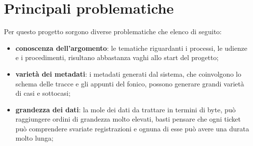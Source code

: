 \section{Principali problematiche}
Per questo progetto sorgono diverse problematiche che elenco di seguito:
\begin{itemize}
  \item \textbf{conoscenza dell'argomento}: le tematiche riguardanti i processi, le udienze e i procedimenti, risultano abbastanza vaghi allo start del progetto;
  \item \textbf{varietà dei metadati}: i metadati generati dal sistema, che coinvolgono lo schema delle tracce e gli appunti del fonico, possono generare grandi varietà di casi e sottocasi;
  \item \textbf{grandezza dei dati}: la mole dei dati da trattare in termini di \gls{byte}\glsfirstoccur, può raggiungere ordini di grandezza molto elevati,
        basti pensare che ogni ticket può comprendere svariate registrazioni e ognuna di esse può avere una durata molto lunga;
\end{itemize}

